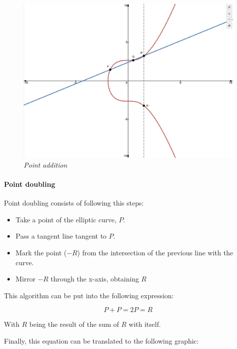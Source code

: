 \documentclass{article}
\begin{document}
\vspace{5mm} %

\begin{figure}[H]
    \begin{center}
        \includegraphics[width=0.6 \textwidth]{images/point_addition.png}
        \caption{\textit{Point addition}}
    \end{center}
\end{figure}

\vspace{5mm} %

\paragraph{Point doubling}

Point doubling consists of following this steps:

\begin{itemize}
    \item Take a point of the elliptic curve, \(P\).
    \item Pass a tangent line tangent to \(P\).
    \item Mark the point (\(-R\)) from the intersection of the previous line with the curve.
    \item Mirror \(-R\) through the x-axis, obtaining \(R\)
\end{itemize}

This algorithm can be put into the following expression:

\[P + P = 2P = R\]

With \(R\) being the result of the sum of \(R\) with itself.

Finally, this equation can be translated to the following graphic:

\vspace{5mm} %
\end{document}
